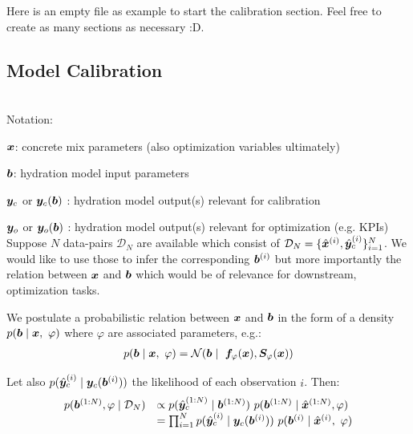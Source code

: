 Here is an empty file as example to start the calibration section.
Feel free to create as many sections as necessary :D.

\subsection{Model Calibration}

\\
%
%
Notation:
\bi
\item $\boldsymbol{x}$: concrete mix parameters (also optimization variables ultimately)
\item $\boldsymbol{b}$: hydration model input parameters
\item $\boldsymbol{y}_c$ or $\boldsymbol{y}_c(\boldsymbol{b})$ : hydration model output(s) relevant for calibration
\item $\boldsymbol{y}_o$ or $\boldsymbol{y}_o(\boldsymbol{b})$ : hydration model  output(s) relevant for optimization (e.g. KPIs)
\ei
Suppose $N$ data-pairs $\mathcal{D}_N$  are available which consist of $\mathcal{D}_N=\{ \hat{\boldsymbol{x}}^{(i)},  \hat{\boldsymbol{y}}_c^{(i)}\}_{i=1}^N$. We would like to use those to infer the corresponding $\boldsymbol{b}^{(i)}$ but more importantly the relation between $\boldsymbol{x}$ and $\boldsymbol{b}$  which would be of relevance for downstream, optimization tasks.

We postulate a probabilistic relation between $\boldsymbol{x}$ and $\boldsymbol{b}$ in the form of a density $p(\boldsymbol{b}\mid \boldsymbol{x}, ~\varphi)$ where $\varphi$ are associated parameters, e.g.:
\begin{align}
	p(\boldsymbol{b}\mid \boldsymbol{x}, ~\varphi)=\mathcal{N}(\boldsymbol{b}\mid ~\boldsymbol{f}_{\varphi} (\boldsymbol{x}), \boldsymbol{S}_{\varphi}(\boldsymbol{x}))
\end{align}

Let also $p(\hat{\boldsymbol{y}}_c^{(i)} \mid \boldsymbol{y}_c(\boldsymbol{b}^{(i)}))$ the likelihood of each observation $i$. Then:
\begin{align}
\begin{array}{ll}
	p(\boldsymbol{b}^{(1:N)}, \varphi \mid \mathcal{D}_N) & \propto p( \hat{\boldsymbol{y}}_c^{(1:N)} \mid \boldsymbol{b}^{(1:N)})~p( \boldsymbol{b}^{(1:N)} \mid \hat{\boldsymbol{x}}^{(1:N)}, \varphi) \\
	& = \prod_{i=1}^N p(\hat{\boldsymbol{y}}_c^{(i)} \mid \boldsymbol{y}_c(\boldsymbol{b}^{(i)}) )~p(\boldsymbol{b}^{(i)} \mid \hat{\boldsymbol{x}}^{(i)} , ~\varphi)
\end{array}
\end{align}

